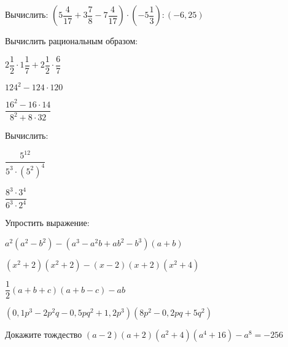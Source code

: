 \begin{listofex}
	\item Вычислить: \( \left( 5\dfrac{4}{17}+3\dfrac{7}{8}-7\dfrac{4}{17} \right)\cdot\left( -5\dfrac{1}{3} \right):(-6,25) \)
	\item Вычислить рациональным образом:
	\begin{enumcols}[itemcolumns=3]
		\item \( 2\dfrac{1}{2}\cdot1\dfrac{1}{7}+2\dfrac{1}{2}\cdot\dfrac{6}{7} \)
		\item \( 124^2-124\cdot120 \)
		\item \( \dfrac{16^2-16\cdot14}{8^2+8\cdot32} \)
	\end{enumcols}
	\item Вычислить:
	\begin{enumcols}[itemcolumns=2]
		\item \( \dfrac{5^{12}}{5^3\cdot(5^2)^4} \)
		\item \( \dfrac{8^3\cdot3^4}{6^3\cdot2^4} \)
	\end{enumcols}
	\item Упростить выражение:
	\begin{enumcols}[itemcolumns=1]
		\item \( a^2(a^2-b^2)-(a^3-a^2b+ab^2-b^3)(a+b) \)
		\item \( (x^2+2)(x^2+2)-(x-2)(x+2)(x^2+4) \)
		\item \( \dfrac{1}{2}(a+b+c)(a+b-c)-ab \)
		\item \( (0,1p^3-2p^2q-0,5pq^2+1,2p^3)(8p^2-0,2pq+5q^2) \)
	\end{enumcols}
	\item Докажите тождество \( (a-2)(a+2)(a^2+4)(a^4+16)-a^8=-256 \)
	
\end{listofex}
%	
%	
%	
%	
%	
%	
%	
